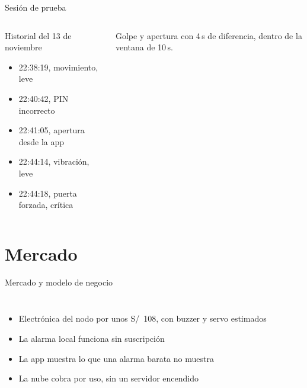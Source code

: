 \documentclass[aspectratio=169,10pt]{beamer}
\begin{document}
\begin{frame}{Sesión de prueba}
  \begin{columns}[c]
    \centering
    \begin{block}{Historial del 13 de noviembre}
      \small
      \begin{itemize}
        \item 22:38:19, movimiento, leve
        \item 22:40:42, PIN incorrecto
        \item 22:41:05, apertura desde la app
        \item 22:44:14, vibración, leve
        \item 22:44:18, puerta forzada, crítica
      \end{itemize}
    \end{block}
    {\small Golpe y apertura con 4\,s de diferencia, dentro de la ventana de 10\,s.}
  \end{columns}
\end{frame}

\section{Mercado}

\begin{frame}{Mercado y modelo de negocio}
  \centering
  \resizebox{!}{1.9cm}{}
  \vspace{2mm}
  \begin{columns}[c]
    \centering
    \resizebox{!}{4.2cm}{}
    \small
    \begin{itemize}
      \item Electrónica del nodo por unos S/~108, con buzzer y servo estimados
      \item La alarma local funciona sin suscripción
      \item La app muestra lo que una alarma barata no muestra
      \item La nube cobra por uso, sin un servidor encendido
    \end{itemize}
  \end{columns}
\end{frame}
\end{document}
